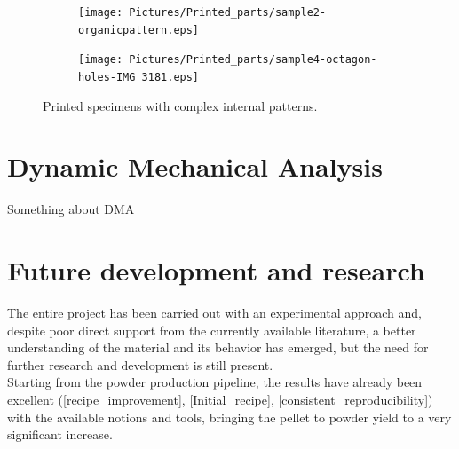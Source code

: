 \documentclass{article}
\begin{document}
        \begin{figure}[h!]
            \centering 
            \begin{subfigure}[a]{0.41\textwidth}
                \texttt{[image: Pictures/Printed\_parts/sample2-organicpattern.eps]}
            \end{subfigure}
                \vfill
            \begin{subfigure}[b]{0.5\textwidth}
                \centering
                \texttt{[image: Pictures/Printed\_parts/sample4-octagon-holes-IMG\_3181.eps]}
            \end{subfigure}
            \caption{Printed specimens with complex internal patterns.}
            \label{fig:printed_specimens_complex}
        \end{figure}



        \clearpage

    \section{Dynamic Mechanical Analysis\label{DMA}}
 
    Something about DMA 

    \clearpage
    \section{Future development and research\label{Future_development_and_research}}

    The entire project has been carried out with an experimental approach and, despite poor direct support 
    from the currently available literature, a better understanding of 
    the material and its behavior has emerged, but the need for further research and development is still 
    present. \\ 

    Starting from the powder production pipeline, the results have already been excellent (\ref{recipe_improvement}, \ref{Initial_recipe}, 
    \ref{consistent_reproducibility}) with the available notions and tools, bringing the pellet to powder yield to 
    a very significant increase. \\ 
\end{document}

